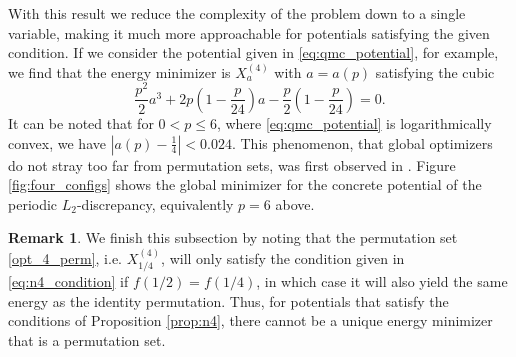\documentclass[a4paper,12pt]{article}
\numberwithin{equation}{section}
\theoremstyle{definition}
\newtheorem{rem}[thm]{Remark}
\newtheorem{prop}[thm]{Proposition}
\begin{document}
With this result we reduce the complexity of the problem down to a single variable, making it much more approachable for potentials satisfying the given condition. If we consider the potential given in \eqref{eq:qmc_potential}, for example, we find that the energy minimizer is $X_a^{(4)}$ with $a = a(p)$ satisfying the cubic
$$
\frac{p^2}2a^3+2p\left(1-\frac p{24}\right)a-\frac p2\left(1-\frac p{24}\right) = 0.
$$
It can be noted that for $0 < p \leq 6$, where \eqref{eq:qmc_potential} is logarithmically convex, we have $|a(p)-\frac14| < 0.024$. This phenomenon, that global optimizers do not stray too far from permutation sets, was first observed in \cite{HO16}. Figure \ref{fig:four_configs} shows the global minimizer for the concrete potential of the periodic $L_2$-discrepancy, equivalently $p=6$ above.

\begin{rem}\label{rem:n4not}
We finish this subsection by noting that the permutation set \eqref{opt_4_perm}, i.e. $X_{1/4}^{(4)}$, will only satisfy the condition given in \eqref{eq:n4_condition} if $f(1/2)=f(1/4)$, in which case it will also yield the same energy as the identity permutation. Thus, for potentials that satisfy the conditions of Proposition \ref{prop:n4}, there cannot be a unique energy minimizer that is a permutation set.
\end{rem}

\end{document}
